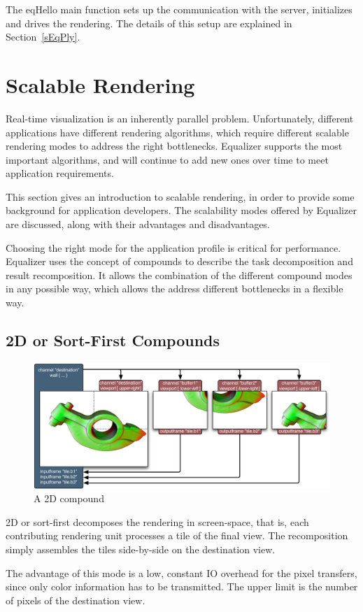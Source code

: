 \documentclass[10pt,a4]{scrartcl}
\newcommand{\sref}[1]{Section~\ref{#1}}
\begin{document}
The \textsf{eqHello} main function sets up the communication with the
server, initializes and drives the rendering. The details of this setup
are explained in \sref{sEqPly}.


\section{Scalable Rendering}

Real-time visualization is an inherently parallel
problem. Unfortunately, different applications have different rendering
algorithms, which require different scalable rendering modes to address
the right bottlenecks. Equalizer supports the most important algorithms,
and will continue to add new ones over time to meet application
requirements.

This section gives an introduction to scalable rendering, in order to
provide some background for application developers. The scalability
modes offered by Equalizer are discussed, along with their advantages
and disadvantages. 

Choosing the right mode for the application profile is critical for
performance. Equalizer uses the concept of compounds to describe the
task decomposition and result recomposition. It allows the combination
of the different compound modes in any possible way, which allows the
address different bottlenecks in a flexible way.


\subsection{2D or Sort-First Compounds}

\begin{figure}
  \includegraphics[width=.618\textwidth]{images/2D.pdf}
  {\caption{\small A 2D compound}}
\end{figure}
2D or sort-first decomposes the rendering in screen-space, that is, each
contributing rendering unit processes a tile of the final view. The
recomposition simply assembles the tiles side-by-side on the destination
view. 

The advantage of this mode is a low, constant IO overhead for the pixel
transfers, since only color information has to be transmitted. The upper
limit is the number of pixels of the destination view.
\end{document}
